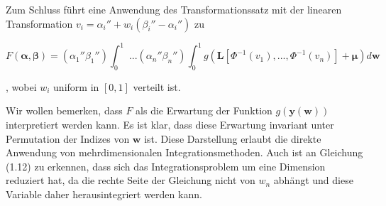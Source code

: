 \documentclass[12pt,a4paper]{scrartcl}
\numberwithin{equation}{section}
\begin{document}
Zum Schluss führt eine Anwendung des Transformationssatz mit der linearen Transformation $v_i = \alpha_i'' + w_i(\beta_i''-\alpha_i'')$ zu

\begin{equation}
  F(\mathbf{\alpha},\mathbf{\beta}) = (\alpha_1'' \beta_1'') \int_{0}^{1} \text{ ...}(\alpha_n'' \beta_n'') \int_{0}^{1} g(\mathbf{L}[\Phi^{-1}(v_1),...,\Phi^{-1}(v_n)] + \mathbf{\mu}) d\mathbf{w}
\end{equation}

, wobei $w_i$ uniform in $[0,1]$ verteilt ist.

Wir wollen bemerken, dass $F$ als die Erwartung der Funktion $g(\mathbf{y(w)})$ interpretiert werden kann. Es ist klar, dass diese Erwartung invariant unter Permutation der Indizes
von $\mathbf{w}$ ist. Diese Darstellung erlaubt die direkte Anwendung von mehrdimensionalen Integrationsmethoden.
Auch ist an Gleichung (1.12) zu erkennen, dass sich das Integrationsproblem um eine Dimension
reduziert hat, da die rechte Seite der Gleichung nicht von $w_n$ abhängt und diese Variable daher
herausintegriert werden kann.
 
\end{document}
